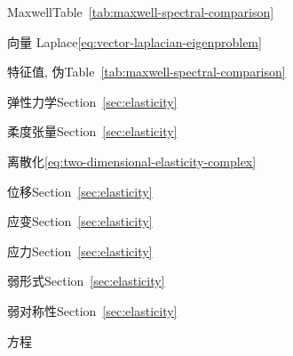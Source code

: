 \begin{theindex}
\subitem {}\label{index:eigenvalue-problem-maxwell}{Maxwell}\quad Table~\ref{tab:maxwell-spectral-comparison}

\subitem {}\label{index:eigenvalue-problem-vector-laplace}{向量 Laplace}\quad \eqref{eq:vector-laplacian-eigenproblem}

\item {}\label{index:eigenvalue-spurious}{特征值, 伪}\quad Table~\ref{tab:maxwell-spectral-comparison}

\item {}\label{index:elasticity}{弹性力学}\quad Section~\ref{sec:elasticity}

\subitem {}\label{index:elasticity-compliance-tensor}{柔度张量}\quad Section~\ref{sec:elasticity}

\subitem {}\label{index:elasticity-discretization}{离散化}\quad \eqref{eq:two-dimensional-elasticity-complex}

\subitem {}\label{index:elasticity-displacement}{位移}\quad Section~\ref{sec:elasticity}

\subitem {}\label{index:elasticity-strain}{应变}\quad Section~\ref{sec:elasticity}

\subitem {}\label{index:elasticity-stress}{应力}\quad Section~\ref{sec:elasticity}

\subitem {}\label{index:elasticity-weak-formulation}{弱形式}\quad Section~\ref{sec:elasticity}

\subitem {}\label{index:elasticity-weak-symmetry}{弱对称性}\quad Section~\ref{sec:elasticity}

\item {}\label{index:equation}{方程}


\end{theindex}
